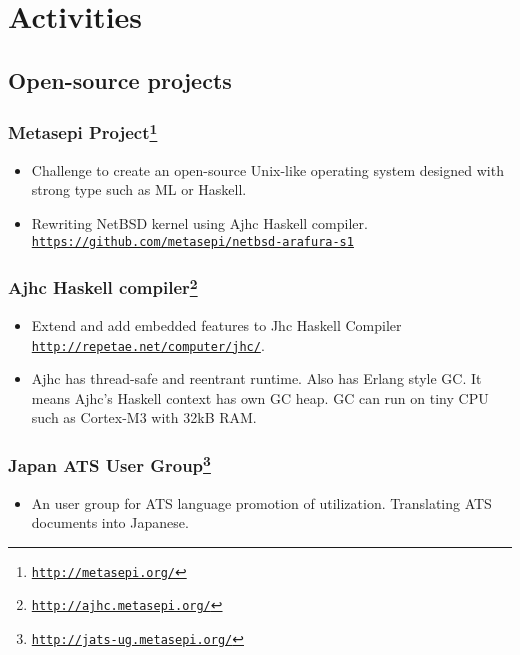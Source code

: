 \documentclass[letterpaper]{article}
\begin{document}
\section*{Activities}

\subsection*{Open-source projects}

\subsubsection*{Metasepi Project\footnote{\href{http://metasepi.org/}{\tt http://metasepi.org/}}}
\begin{itemize}
\item Challenge to create an open-source Unix-like operating system designed with strong type such as ML or Haskell.
\item Rewriting NetBSD kernel using Ajhc Haskell compiler. \href{https://github.com/metasepi/netbsd-arafura-s1}{\tt https://github.com/metasepi/netbsd-arafura-s1}
\end{itemize}

\subsubsection*{Ajhc Haskell compiler\footnote{\href{http://ajhc.metasepi.org/}{\tt http://ajhc.metasepi.org/}}}
\begin{itemize}
\item Extend and add embedded features to Jhc Haskell Compiler \href{http://repetae.net/computer/jhc/}{\tt http://repetae.net/computer/jhc/}.
\item Ajhc has thread-safe and reentrant runtime. Also has Erlang style GC. It means Ajhc's Haskell context has own GC heap. GC can run on tiny CPU such as Cortex-M3 with 32kB RAM.
\end{itemize}

\subsubsection*{Japan ATS User Group\footnote{\href{http://jats-ug.metasepi.org/}{\tt http://jats-ug.metasepi.org/}}}
\begin{itemize}
\item An user group for ATS language promotion of utilization. Translating ATS documents into Japanese.
\end{itemize}
\end{document}
